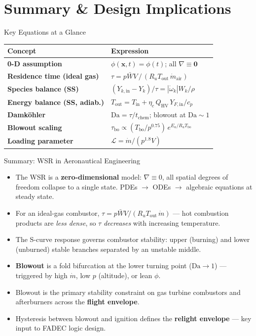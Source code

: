 \documentclass[12pt,aspectratio=169]{beamer}
\newcommand{\taures}{\tau}
\newcommand{\tchem}{t_{\text{chem}}}
\newcommand{\Da}{\mathrm{Da}}
\newcommand{\Vr}{V}
\newcommand{\Tin}{T_{\text{in}}}
\newcommand{\Tout}{T_{\text{out}}}
\newcommand{\mdot}{\dot{m}}
\begin{document}
\section{Summary \& Design Implications}

\begin{frame}{Key Equations at a Glance}
  \renewcommand{\arraystretch}{1.6}
  \begin{tabular}{>{\bfseries}p{4.2cm} p{7.5cm}}
    \toprule
    Concept & Expression \\
    \midrule
    0-D assumption & $\phi(\mathbf{x},t) = \phi(t)$; all $\nabla \equiv \mathbf{0}$ \\
    Residence time (ideal gas) &
      $\taures = p\bar{W}\Vr\,/\,(R_u\Tout\,\mdot_{\text{air}})$ \\
    Species balance (SS) &
      $(Y_{k,\text{in}}-Y_k)/\taures = |\dot{\omega}_k|W_k/\rho$ \\
    Energy balance (SS, adiab.) &
      $\Tout = \Tin + \eta_c\,Q_{\text{HV}}\,Y_{F,\text{in}}/c_p$ \\
    Damk\"{o}hler & $\Da = \taures/\tchem$; blowout at $\Da \sim 1$ \\
    Blowout scaling &
      $\taures_{\text{bo}} \propto (T_{\text{bo}}/p^{0.75})\,
        e^{E_a/R_u T_{\text{bo}}}$ \\
    Loading parameter & $\mathcal{L} = \mdot/(p^{1.8}\Vr)$ \\
    \bottomrule
  \end{tabular}
\end{frame}

\begin{frame}{Summary: WSR in Aeronautical Engineering}
  \begin{itemize}
    \item The WSR is a \textbf{zero-dimensional} model: $\nabla\equiv 0$, all
          spatial degrees of freedom collapse to a single state.  PDEs
          $\to$ ODEs $\to$ algebraic equations at steady state.
    \item For an ideal-gas combustor, $\taures = p\bar{W}\Vr/(R_u\Tout\,\mdot)$
          --- hot combustion products are \emph{less dense}, so $\taures$
          \emph{decreases} with increasing temperature.
    \item The S-curve response governs combustor stability: upper (burning)
          and lower (unburned) stable branches separated by an unstable middle.
    \item \alert{\textbf{Blowout}} is a fold bifurcation at the lower turning point
          ($\Da\to 1$) --- triggered by high $\mdot$, low $p$ (altitude),
          or lean $\phi$.
    \item Blowout is the primary stability constraint on gas turbine combustors
          and afterburners across the \textbf{flight envelope}.
    \item Hysteresis between blowout and ignition defines the
          \textbf{relight envelope} --- key input to FADEC logic design.
  \end{itemize}
\end{frame}

\appendix
\end{document}
